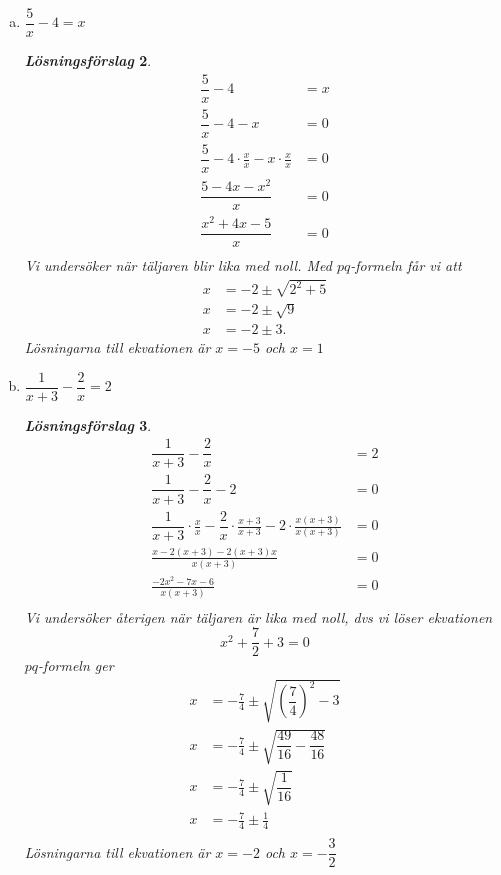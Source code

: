 \documentclass[a4paper]{article}
\newtheorem*{sol}{\normalfont\textit{Lösningsförslag}}
\begin{document}
\begin{enumerate}[(a)]
\begin{sol}
\begin{align*}
      3x &= 12 \\[1em]
      x &= \frac{12}{3} = 4 \\[1em]
    \end{align*}
    Lösningen till ekvationen är $x = 4$.
  \end{sol}
\item $\dfrac{5}{x} - 4 = x$
  \begin{sol}
    \begin{align*}
      \dfrac{5}{x} - 4 &= x \\[1em]
      \dfrac{5}{x} - 4 -x &= 0 \\[1em]
      \dfrac{5}{x} - 4\cdot \frac{x}{x} -x\cdot \frac{x}{x} &= 0 \\[1em]
      \dfrac{5-4x-x^2}{x} &= 0 \\[1em]
      \dfrac{x^2 + 4x -5}{x} &= 0 \\[1em]
    \end{align*}
    Vi undersöker när täljaren blir lika med noll. Med $pq$-formeln
    får vi att
    \begin{align*}
      x &= -2 \pm \sqrt{2^2 + 5} \\[1em]
      x &= -2 \pm \sqrt{9} \\[1em]
      x &= -2 \pm 3.
    \end{align*}
    Lösningarna till ekvationen är $x = -5$ och $x = 1$
  \end{sol}
\item $\dfrac{1}{x+3} - \dfrac{2}{x} = 2$
  \begin{sol}
    \begin{align*}
      \dfrac{1}{x+3} - \dfrac{2}{x} &= 2 \\[1em]
      \dfrac{1}{x+3} - \dfrac{2}{x} -2 &= 0 \\[1em]
      \dfrac{1}{x+3}\cdot \frac{x}{x} - \dfrac{2}{x}\cdot
      \frac{x+3}{x+3} -2\cdot \frac{x(x+3)}{x(x+3)} &= 0 \\[1em]
      \frac{x- 2(x+3) - 2(x+3)x}{x(x+3)}&=0 \\[1em]
      \frac{-2x^2-7x-6}{x(x+3)}&=0 \\[1em]
    \end{align*}
    Vi undersöker återigen när täljaren är lika med noll, dvs vi löser
    ekvationen
    \[
      x^2 +\frac{7}{2} +3 = 0
    \]
    $pq$-formeln ger
    \begin{align*}
      x &= - \frac{7}{4} \pm \sqrt{\left(\dfrac{7}{4} \right)^2 -3} \\[1em]
      x &= - \frac{7}{4} \pm \sqrt{\dfrac{49}{16} -\dfrac{48}{16}} \\[1em]
      x &= - \frac{7}{4} \pm \sqrt{\dfrac{1}{16}} \\[1em]
      x &= - \frac{7}{4} \pm \frac{1}{4} \\[1em]
    \end{align*}
    Lösningarna till ekvationen är $x = -2$ och $x = -\dfrac{3}{2}$
  \end{sol}
\end{enumerate}
\end{document}
